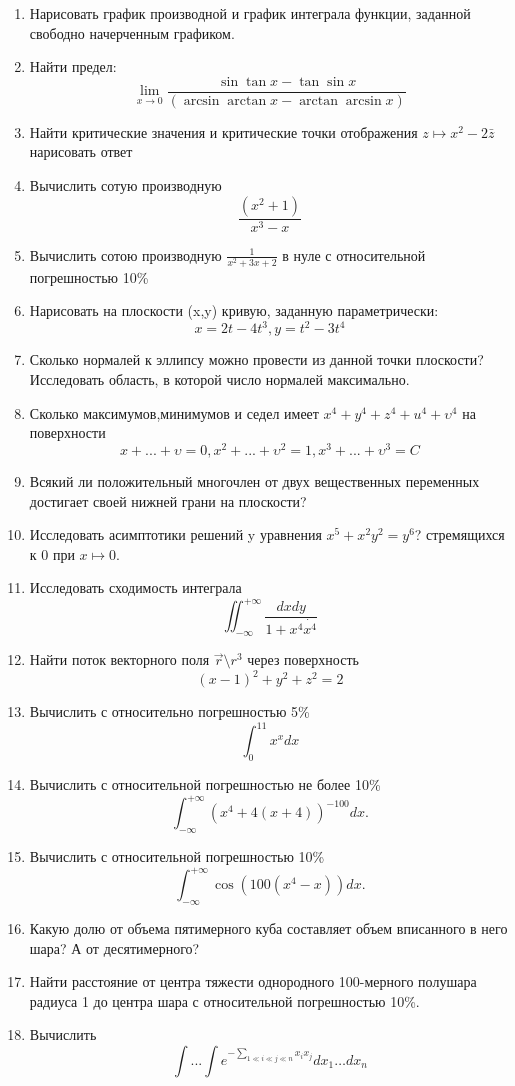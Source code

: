 \documentclass{article}
\begin{document}
\begin{enumerate}
\item Нарисовать график производной и график интеграла функции, заданной свободно начерченным графиком.
\item Найти предел: $$\lim_{x\to 0}\frac{\sin\tan x-\tan\sin x}{(\arcsin\arctan x-\arctan\arcsin x)}$$
\item Найти критические значения и критические точки отображения $z\mapsto x^{2}-2\bar{z}$ нарисовать ответ
\item Вычислить сотую производную  $$\frac{(x^{2}+1)}{x^{3}-x}$$
\item Вычислить сотою производную $\frac{1}{x^{2}+3x+2}$
 в нуле с относительной погрешностью 10\%
\item Нарисовать на плоскости (x,y) кривую, заданную параметрически: $$x=2t- 4t^{3}, y=t^{2}-3 t^{4}$$
\item Сколько нормалей к эллипсу можно провести из данной точки плоскости? Исследовать область, в которой число нормалей максимально.
\item Сколько максимумов,минимумов и седел имеет $x^{4}+y^{4}+z^{4}+u^{4}+\upsilon^{4}$ на поверхности $$x+...+\upsilon=0,x^{2}+...+\upsilon^{2}=1,
x^{3}+...+\upsilon^{3}=C$$
\item Всякий ли положительный многочлен от двух вещественных переменных достигает своей нижней грани на плоскости?
\item Исследовать асимптотики решений y уравнения $x^{5}+x^{2}y^{2}=y^{6}$? стремящихся к 0 при $x\mapsto0$.
\item Исследовать сходимость интеграла $$\iint_{-\infty}^{+\infty}\frac{dxdy}{1+x^{4}\dot{x^{4}}}$$
\item Найти поток векторного поля $\vec{r}\setminus r^{3}$ через поверхность $$(x-1)^{2}+y^{2}+z^{2}=2$$
\item Вычислить с относительно погрешностью 5\% $$\int_0^11x^{x}dx$$
\item Вычислить с относительной погрешностью не более 10\% $$\int_{-\infty}^{+\infty}(x^{4}+4(x+4))^{-100}dx.$$
\item Вычислить с относительной погрешностью 10\% $$\int_{-\infty}^{+\infty}\cos(100(x^{4}-x))dx.$$
\item Какую долю от объема пятимерного куба составляет объем вписанного в него шара? А от десятимерного?
\item Найти расстояние от центра тяжести однородного 100-мерного полушара радиуса 1 до центра шара с относительной погрешностью 10\%.
\item Вычислить $$\int...\int e^{-\sum_{1\ll i\ll j\ll n}x_{i} x_{j}}dx_{1}\dots dx_{n}$$ 

\end{enumerate}
\end{document}
